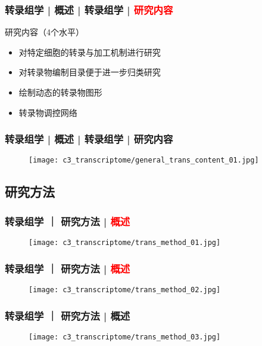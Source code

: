 \begin{frame}
  \frametitle{转录组学 | 概述 | 转录组学 | \textcolor{red}{研究内容}}
  \begin{block}{研究内容（4个水平）}
    \begin{itemize}
      \item 对特定细胞的转录与加工机制进行研究
      \item 对转录物编制目录便于进一步归类研究
      \item 绘制动态的转录物图形
      \item 转录物调控网络
    \end{itemize}
  \end{block}
\end{frame}

\begin{frame}
  \frametitle{转录组学 | 概述 | 转录组学 | 研究内容}
  \begin{figure}
    \centering
    \texttt{[image: c3\_transcriptome/general\_trans\_content\_01.jpg]}
  \end{figure}
\end{frame}

\subsection{研究方法}
\begin{frame}
  \frametitle{转录组学 ｜ 研究方法 | \textcolor{red}{概述}}
  \begin{figure}
    \centering
    \texttt{[image: c3\_transcriptome/trans\_method\_01.jpg]}
  \end{figure}
\end{frame}

\begin{frame}
  \frametitle{转录组学 ｜ 研究方法 | \textcolor{red}{概述}}
  \begin{figure}
    \centering
    \texttt{[image: c3\_transcriptome/trans\_method\_02.jpg]}
  \end{figure}
\end{frame}

\begin{frame}
  \frametitle{转录组学 ｜ 研究方法 | 概述}
  \begin{figure}
    \centering
    \texttt{[image: c3\_transcriptome/trans\_method\_03.jpg]}
  \end{figure}
\end{frame}

